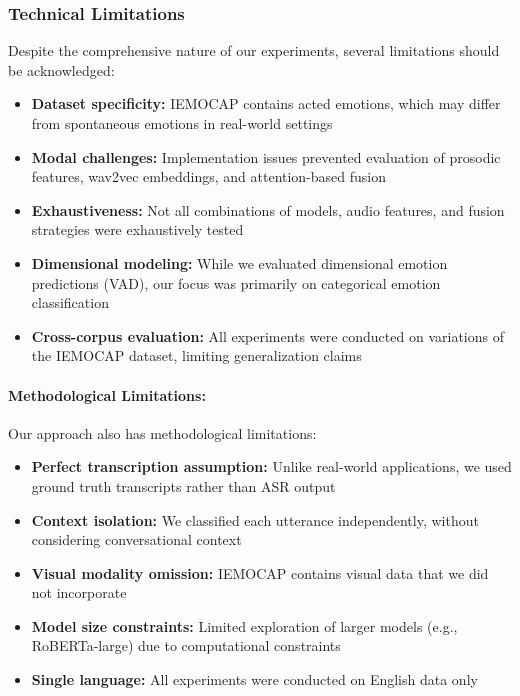 \documentclass[12pt]{article}
\begin{document}
\subsubsection{Technical Limitations}
Despite the comprehensive nature of our experiments, several limitations should be acknowledged:

\begin{itemize}
    \item \textbf{Dataset specificity:} IEMOCAP contains acted emotions, which may differ from spontaneous emotions in real-world settings
    
    \item \textbf{Modal challenges:} Implementation issues prevented evaluation of prosodic features, wav2vec embeddings, and attention-based fusion
    
    \item \textbf{Exhaustiveness:} Not all combinations of models, audio features, and fusion strategies were exhaustively tested
    
    \item \textbf{Dimensional modeling:} While we evaluated dimensional emotion predictions (VAD), our focus was primarily on categorical emotion classification
    
    \item \textbf{Cross-corpus evaluation:} All experiments were conducted on variations of the IEMOCAP dataset, limiting generalization claims
\end{itemize}

\paragraph{Methodological Limitations:}
Our approach also has methodological limitations:

\begin{itemize}
    \item \textbf{Perfect transcription assumption:} Unlike real-world applications, we used ground truth transcripts rather than ASR output
    
    \item \textbf{Context isolation:} We classified each utterance independently, without considering conversational context
    
    \item \textbf{Visual modality omission:} IEMOCAP contains visual data that we did not incorporate
    
    \item \textbf{Model size constraints:} Limited exploration of larger models (e.g., RoBERTa-large) due to computational constraints
    
    \item \textbf{Single language:} All experiments were conducted on English data only
\end{itemize}
\end{document}
